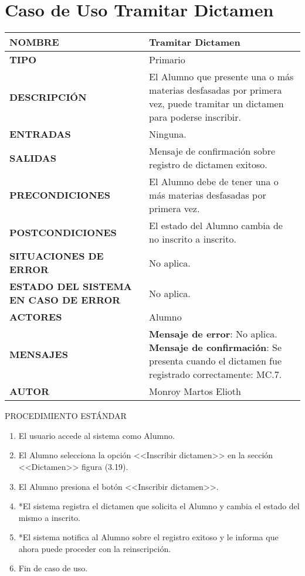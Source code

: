 \newpage
\section{Caso de Uso Tramitar Dictamen}
\begin{longtable}{ | p{6cm} | p{10cm} |}
    \hline
    \textbf{NOMBRE} & Tramitar Dictamen\\
    \hline
    \textbf{TIPO} & Primario\\
    \hline
    \textbf{DESCRIPCIÓN} & El Alumno que presente una o más materias desfasadas por primera vez, puede tramitar un dictamen para poderse inscribir.\\
    \hline
    \textbf{ENTRADAS} & Ninguna.\\
    \hline
    \textbf{SALIDAS} & Mensaje de confirmación sobre registro de dictamen exitoso.\\
    \hline
    \textbf{PRECONDICIONES} & El Alumno debe de tener una o más materias desfasadas por primera vez.\\
    \hline
    \textbf{POSTCONDICIONES} & El estado del Alumno cambia de no inscrito a inscrito.\\
    \hline
    \textbf{SITUACIONES DE ERROR} & No aplica.\\
    \hline
    \textbf{ESTADO DEL SISTEMA EN CASO DE ERROR} &  No aplica.\\
    \hline
    \textbf{ACTORES} & Alumno\\
    \hline
    \textbf{MENSAJES} & \textbf{Mensaje de error}: No aplica.
    \newline \textbf{Mensaje de confirmación}: Se presenta cuando el dictamen fue registrado correctamente: MC.7.\\
    \hline
    \textbf{AUTOR} & Monroy Martos Elioth\\
    \hline
\end{longtable}
\vspace*{1cm}
\noindent
\Large{PROCEDIMIENTO ESTÁNDAR}
\large{}
\begin{enumerate}
    \item El usuario accede al sistema como Alumno.
	\item El Alumno selecciona la opción <<Inscribir dictamen>> en la sección <<Dictamen>> figura (3.19).
	\item El Alumno presiona el botón <<Inscribir dictamen>>.
	\item *El sistema registra el dictamen que solicita el Alumno y cambia el estado del mismo a inscrito.
	\item *El sistema notifica al Alumno sobre el registro exitoso y le informa que ahora puede proceder con la reinscripción.
	\item Fin de caso de uso.
\end{enumerate} 